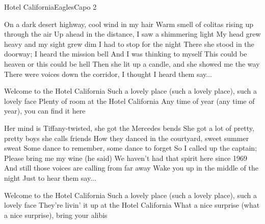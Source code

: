 \begin{song}{Hotel California}{Eagles}{Capo 2}


On a dark desert highway, cool wind in my hair
Warm smell of colitas rising up through the air
Up ahead in the distance, I saw a shimmering light
My head grew heavy and my sight grew dim
I had to stop for the night
There she stood in the doorway; I heard the mission bell
And I was thinking to myself
This could be heaven or this could be hell
Then she lit up a candle, and she showed me the way
There were voices down the corridor,
I thought I heard them say...

Welcome to the Hotel California
Such a lovely place (such a lovely place), such a lovely face
Plenty of room at the Hotel California
Any time of year (any time of year), you can find it here

Her mind is Tiffany-twisted, she got the Mercedes bends
She got a lot of pretty, pretty boys   she calls friends
How they danced in the courtyard, sweet summer sweat
Some dance to remember, some dance to forget
So I called up the captain; Please bring me my wine (he said)
We haven't had that spirit here since 1969
And still those voices are calling from far away
Wake you up in the middle of the night
Just to hear them say...

Welcome to the Hotel California
Such a lovely place (such a lovely place), such a lovely face
They're livin' it up at the Hotel California
What a nice surprise (what a nice surprise), bring your alibis


\end{song}
